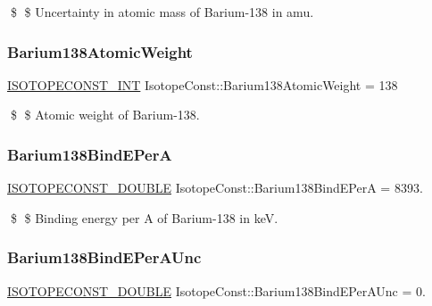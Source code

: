\$ \$ Uncertainty in atomic mass of Barium-\/138 in amu. \mbox{\label{group___isotope_const-_barium-_ba138_gab278079c091ef79fd6f4026a4af20ebe}} 
\subsubsection{\texorpdfstring{Barium138\+Atomic\+Weight}{Barium138AtomicWeight}}
{\footnotesize\ttfamily \mbox{\hyperlink{group___isotope_const-_macros_ga5f18360b3e99483a35c32d789e62621c}{I\+S\+O\+T\+O\+P\+E\+C\+O\+N\+S\+T\+\_\+\+I\+NT}} Isotope\+Const\+::\+Barium138\+Atomic\+Weight = 138}

\$ \$ Atomic weight of Barium-\/138. \mbox{\label{group___isotope_const-_barium-_ba138_ga45fa0009cb54fe1408668e863515c4db}} 
\subsubsection{\texorpdfstring{Barium138\+Bind\+E\+PerA}{Barium138BindEPerA}}
{\footnotesize\ttfamily \mbox{\hyperlink{group___isotope_const-_macros_ga8f45a7272ce02c0b4c65c44636ed719a}{I\+S\+O\+T\+O\+P\+E\+C\+O\+N\+S\+T\+\_\+\+D\+O\+U\+B\+LE}} Isotope\+Const\+::\+Barium138\+Bind\+E\+PerA = 8393.}

\$ \$ Binding energy per A of Barium-\/138 in keV. \mbox{\label{group___isotope_const-_barium-_ba138_ga4019e6b15d239a703023718f213f204e}} 
\subsubsection{\texorpdfstring{Barium138\+Bind\+E\+Per\+A\+Unc}{Barium138BindEPerAUnc}}
{\footnotesize\ttfamily \mbox{\hyperlink{group___isotope_const-_macros_ga8f45a7272ce02c0b4c65c44636ed719a}{I\+S\+O\+T\+O\+P\+E\+C\+O\+N\+S\+T\+\_\+\+D\+O\+U\+B\+LE}} Isotope\+Const\+::\+Barium138\+Bind\+E\+Per\+A\+Unc = 0.}

